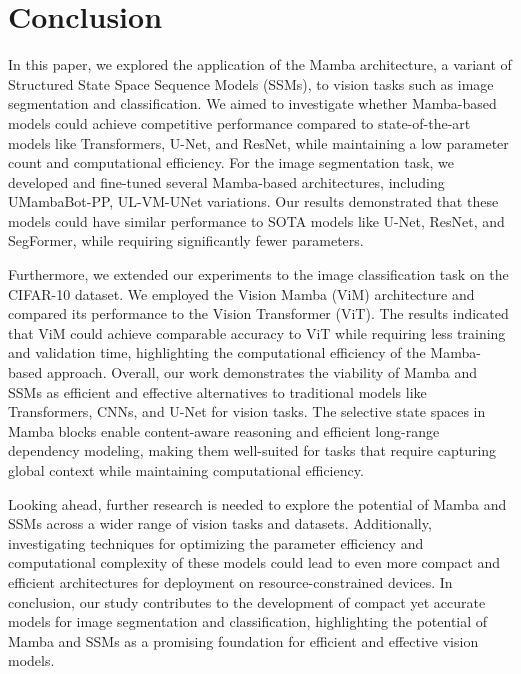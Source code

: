 \documentclass[conference]{IEEEtran}
\begin{document}
\section{Conclusion}
In this paper, we explored the application of the Mamba architecture, a variant of Structured State Space Sequence Models (SSMs), to vision tasks such as image segmentation and classification. We aimed to investigate whether Mamba-based models could achieve competitive performance compared to state-of-the-art models like Transformers, U-Net, and ResNet, while maintaining a low parameter count and computational efficiency.
For the image segmentation task, we developed and fine-tuned several Mamba-based architectures, including UMambaBot-PP, UL-VM-UNet variations. Our results demonstrated that these models could have similar performance to SOTA models like U-Net, ResNet, and SegFormer, while requiring significantly fewer parameters. 

Furthermore, we extended our experiments to the image classification task on the CIFAR-10 dataset. We employed the Vision Mamba (ViM) architecture and compared its performance to the Vision Transformer (ViT). The results indicated that ViM could achieve comparable accuracy to ViT while requiring less training and validation time, highlighting the computational efficiency of the Mamba-based approach.
Overall, our work demonstrates the viability of Mamba and SSMs as efficient and effective alternatives to traditional models like Transformers, CNNs, and U-Net for vision tasks. The selective state spaces in Mamba blocks enable content-aware reasoning and efficient long-range dependency modeling, making them well-suited for tasks that require capturing global context while maintaining computational efficiency.

Looking ahead, further research is needed to explore the potential of Mamba and SSMs across a wider range of vision tasks and datasets. Additionally, investigating techniques for optimizing the parameter efficiency and computational complexity of these models could lead to even more compact and efficient architectures for deployment on resource-constrained devices.
In conclusion, our study contributes to the development of compact yet accurate models for image segmentation and classification, highlighting the potential of Mamba and SSMs as a promising foundation for efficient and effective vision models.





\appendix
\end{document}
